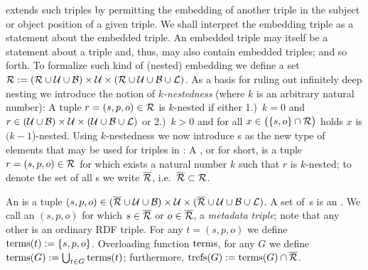 {\RDFplus} extends such triples by permitting the embedding of another triple in the subject or object position of a given triple. We shall interpret the embedding triple as a statement about the embedded triple. An embedded triple may itself be a statement about a triple and, thus, may also contain embedded triples; and so forth.
%
	To formalize
such kind of (nested) embedding we
	define
a set $\mathcal{R} := (\mathcal{R} \cup \mathcal{U} \cup \mathcal{B}) \times \mathcal{U} \times (\mathcal{R} \cup \mathcal{U} \cup \mathcal{B} \cup \mathcal{L})$.
%
	As a basis for ruling
out infinitely deep nesting we introduce the notion of \emph{$k$-nestedness} (where $k$
	is an arbitrary
natural number): A tuple $r=(s,p,o) \in \mathcal{R}$ is $k$-nested if either 1.)~$k=0$ and $r\in (\mathcal{U} \cup \mathcal{B}) \times \mathcal{U} \times (\mathcal{U} \cup \mathcal{B} \cup \mathcal{L})$ or 2.)~$k>0$ and for all $x \in \bigl( \lbrace s,o \rbrace \cap \mathcal{R} \bigr)$ holds $x$ is $(k\!-\!1$)-nested.
%
Using $k$-nestedness we now
	introduce {\TRefLongVersion}s as
the new type of elements that may be used for triples in {\RDFplus}: A 
%
	\emph{{\TRefLongVersion}}, or \emph{\TRef} for short,
is a tuple $r = (s,p,o) \in \mathcal{R}$ for which exists a natural number $k$ such that $r$ is $k$-nested; to denote the set of all {\TRef}s we write $\overline{\mathcal{R}}$, i.e.~$\overline{\mathcal{R}} \subset \mathcal{R}$.

An \emph{{\RDFplusTriple}} is a tuple $(s,p,o) \in (\overline{\mathcal{R}} \cup \mathcal{U} \cup \mathcal{B}) \times \mathcal{U} \times (\overline{\mathcal{R}} \cup \mathcal{U} \cup \mathcal{B} \cup \mathcal{L})$.
A set
	of~{\RDFplusTriple}s  %
is an \emph{{\RDFplusGraph}}.
We call an {\RDFplusTriple}
	$(s,p,o)$ for which $s \in \overline{\mathcal{R}}$ or $o \in \overline{\mathcal{R}}$,
a \emph{metadata triple}; note that any other {\RDFplusTriple} is an ordinary RDF triple.
For any {\RDFplusTriple} $t=(s,p,o)$ we define
	$\mathrm{terms}(t) := \lbrace s,p,o \rbrace$.
Overloading
	function $\mathrm{terms}$, for any {\RDFplusGraph} $G$ we define $\mathrm{terms}(G) := \bigcup_{t \in G} \mathrm{terms}(t)$; furthermore, $\mathrm{trefs}(G) := \mathrm{terms}(G) \cap \overline{\mathcal{R}}$.

